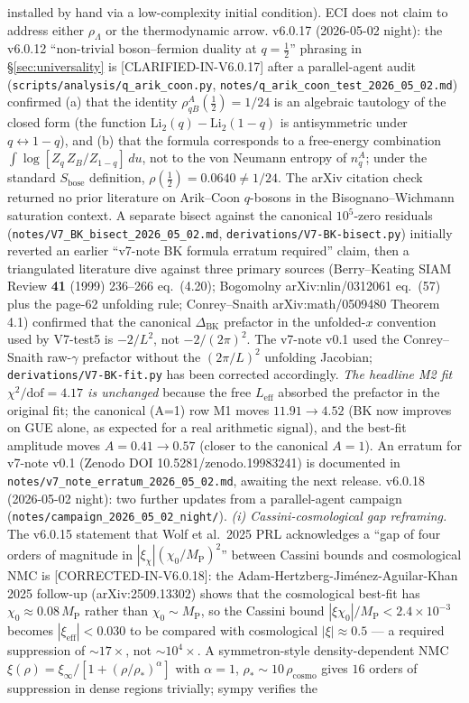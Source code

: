 \documentclass[reprint,amsmath,amssymb,aps,prd,superscriptaddress]{revtex4-2}
\providecommand{\1}{\mathbf{1}}
\begin{document}
installed by hand via a low-complexity initial condition). ECI does not claim to address either $\rho_\Lambda$ or the thermodynamic arrow. v6.0.17 (2026-05-02 night): the v6.0.12 ``non-trivial boson--fermion duality at $q{=}\tfrac{1}{2}$'' phrasing in \S\ref{sec:universality} is [CLARIFIED-IN-V6.0.17] after a parallel-agent audit (\texttt{scripts/analysis/q\_arik\_coon.py}, \texttt{notes/q\_arik\_coon\_test\_2026\_05\_02.md}) confirmed (a) that the identity $\rho_{qB}^A(\tfrac{1}{2})=1/24$ is an algebraic tautology of the closed form (the function $\mathrm{Li}_2(q)-\mathrm{Li}_2(1-q)$ is antisymmetric under $q\leftrightarrow 1-q$), and (b) that the formula corresponds to a free-energy combination $\int \log[Z_q\,Z_B/Z_{1-q}]\,du$, not to the von Neumann entropy of $n_q^A$; under the standard $S_\mathrm{bose}$ definition, $\rho(\tfrac{1}{2})=0.0640\neq 1/24$. The arXiv citation check returned no prior literature on Arik--Coon $q$-bosons in the Bisognano--Wichmann saturation context. A separate bisect against the canonical $10^5$-zero residuals (\texttt{notes/V7\_BK\_bisect\_2026\_05\_02.md}, \texttt{derivations/V7-BK-bisect.py}) initially reverted an earlier ``v7-note BK formula erratum required'' claim, then a triangulated literature dive against three primary sources (Berry--Keating SIAM Review \textbf{41} (1999) 236--266 eq.~(4.20); Bogomolny arXiv:nlin/0312061 eq.~(57) plus the page-62 unfolding rule; Conrey--Snaith arXiv:math/0509480 Theorem 4.1) confirmed that the canonical $\Delta_\mathrm{BK}$ prefactor in the unfolded-$x$ convention used by V7-test5 is $-2/L^2$, not $-2/(2\pi)^2$. The v7-note v0.1 used the Conrey--Snaith raw-$\gamma$ prefactor without the $(2\pi/L)^2$ unfolding Jacobian; \texttt{derivations/V7-BK-fit.py} has been corrected accordingly. \emph{The headline M2 fit $\chi^2/\mathrm{dof}=4.17$ is unchanged} because the free $L_\mathrm{eff}$ absorbed the prefactor in the original fit; the canonical (A=1) row M1 moves $11.91 \to 4.52$ (BK now improves on GUE alone, as expected for a real arithmetic signal), and the best-fit amplitude moves $A=0.41 \to 0.57$ (closer to the canonical $A=1$). An erratum for v7-note v0.1 (Zenodo DOI 10.5281/zenodo.19983241) is documented in \texttt{notes/v7\_note\_erratum\_2026\_05\_02.md}, awaiting the next release. v6.0.18 (2026-05-02 night): two further updates from a parallel-agent campaign (\texttt{notes/campaign\_2026\_05\_02\_night/}). \emph{(i) Cassini-cosmological gap reframing.} The v6.0.15 statement that Wolf et al.\ 2025 PRL acknowledges a ``gap of four orders of magnitude in $|\xi_\chi|(\chi_0/M_\mathrm{P})^2$'' between Cassini bounds and cosmological NMC is [CORRECTED-IN-V6.0.18]: the Adam-Hertzberg-Jim\'enez-Aguilar-Khan 2025 follow-up (arXiv:2509.13302) shows that the cosmological best-fit has $\chi_0 \approx 0.08\,M_\mathrm{P}$ rather than $\chi_0 \sim M_\mathrm{P}$, so the Cassini bound $|\xi\chi_0|/M_\mathrm{P} < 2.4\times 10^{-3}$ becomes $|\xi_\mathrm{eff}| < 0.030$ to be compared with cosmological $|\xi| \approx 0.5$ — a required suppression of $\sim 17\times$, not $\sim 10^4\times$. A symmetron-style density-dependent NMC $\xi(\rho) = \xi_\infty/[1 + (\rho/\rho_*)^\alpha]$ with $\alpha=1$, $\rho_* \sim 10\,\rho_\mathrm{cosmo}$ gives $16$ orders of suppression in dense regions trivially; sympy verifies the 
\end{document}
